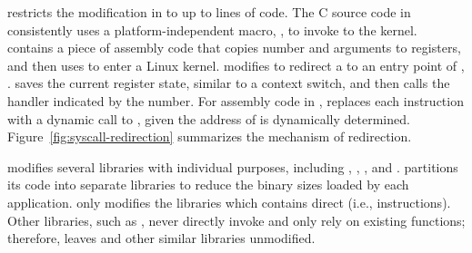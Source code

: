 \graphene{} restricts the modification in \glibc{}
to up to \gipclines{} lines of code.
The C source code in \glibc{} consistently uses a platform-independent macro,
,
to invoke \linuxapis{} to the kernel.
 contains a piece of assembly code
that copies \linuxapi{} number and arguments to registers,
and then uses  to enter a Linux kernel.
\graphene{} modifies 
to redirect a \linuxapi{} to
an entry point of \thelibos{}, .
 saves the current register state, similar to a context switch,
and then
calls the \linuxapi{} handler
indicated by the \linuxapi{} number.
For assembly code in \glibc{},
\graphene{} replaces each  instruction with
a dynamic call to
, given the address of  is dynamically determined.
Figure~\ref{fig:syscall-redirection} summarizes the mechanism of \linuxapi{} redirection.


\graphene{} modifies several \glibc{} libraries with individual purposes,
including , , \libpthread{}, and \libdl{}.
\Glibc{} partitions its code into separate libraries to reduce the binary sizes
loaded by each application.
\graphene{} only modifies the libraries which contains direct \linuxapis{} (i.e.,  instructions).
Other \libc{} libraries, such as ,
never directly invoke \linuxapis{} and only rely on 
existing \libc{} functions;
therefore, \graphene{} leaves  and other similar \libc{} libraries unmodified.



